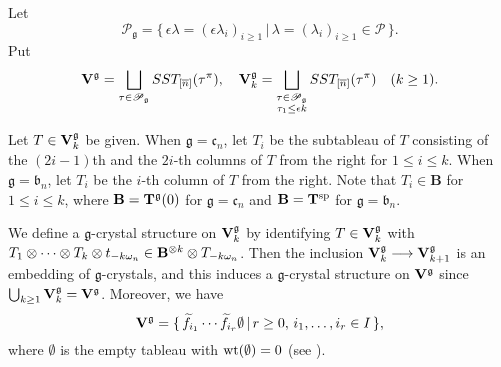 \documentclass[leqno,11pt]{amsart}
\numberwithin{equation}{section}
\newcommand{\B}{\mathbf{B}}
\newcommand{\cP}{\mathscr{P}}
\newcommand{\ov}{\overline}
\newcommand{\tf}{\widetilde{f}}
\newcommand{\g}{\mathfrak{g}}
\newcommand{\mf}{\mathfrak}
\begin{document}
Let
\begin{equation*}
\cP_{\mf g} =\{\,\epsilon\lambda=(\epsilon\lambda_i)_{i\geq 1}\,|\, \lambda=(\lambda_i)_{i\geq 1}\in\cP \,\}.
\end{equation*}
Put
\begin{equation*}
{\bf V}^{\g} = \bigsqcup_{\tau\in\cP_{\mf g}}SST_{[\ov{n}]}(\tau^\pi),\quad 
{\bf V}^\g_{k}=\bigsqcup_{\substack{\tau\in\cP_{\mf g} \\ \tau_1\leq \epsilon k}}SST_{[\ov{n}]}(\tau^\pi) \quad (k\geq 1).
\end{equation*}


Let $T\in {\bf V}^\g_k$ be given.
When $\g=\mf c_n$, let $T_i$ be the subtableau of $T$ consisting of the $(2i-1)$th and the $2i$-th columns of $T$ from the right for $1\leq i\leq k$. When $\g=\mf b_n$, let $T_i$ be the $i$-th column of $T$ from the right. Note that $T_i\in \B$ for $1\leq i\leq k$, where $\B={\bf T}^{\g}(0)$ for $\g={\mf c}_n$ and $\B={\bf T}^{\rm sp}$ for   $\g={\mf b}_n$.

We define a $\g$-crystal structure on ${\bf V}^\g_k$ by identifying $T\in {\bf V}^\g_k$ with $T_1\otimes\cdots\otimes T_k\otimes t_{-k\omega_n}\in {\bf B}^{\otimes k}\otimes T_{-k\omega_n}$. Then the inclusion ${\bf V}^\g_{k}\longrightarrow {\bf V}^\g_{k+1}$ is an embedding of $\g$-crystals, and this induces a $\g$-crystal structure on ${\bf V}^\g$ since $\bigcup_{k\geq 1}{\bf V}^\g_k={\bf V}^\g$. Moreover, we have
\begin{equation*}
{\bf V}^\g=\{\,\tf_{i_1}\cdots\tf_{i_r}\emptyset \,|\,r\geq 0,\, i_1,\ldots,i_r\in I\,\},
\end{equation*}
where $\emptyset$ is the empty tableau with ${\rm wt}(\emptyset)=0$ (see \cite[Section 3.1]{K12}).
\end{document}
